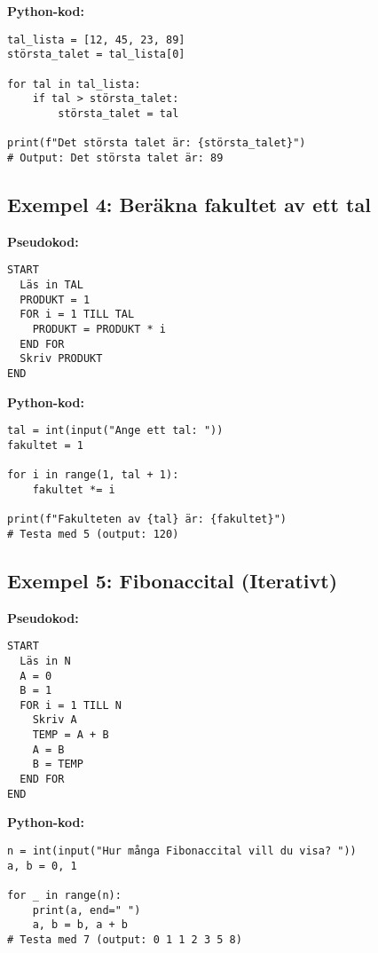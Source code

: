 \textbf{Python-kod:}
\begin{lstlisting}[title=Hitta det största talet i en lista]
tal_lista = [12, 45, 23, 89]
största_talet = tal_lista[0]

for tal in tal_lista:
    if tal > största_talet:
        största_talet = tal

print(f"Det största talet är: {största_talet}")
# Output: Det största talet är: 89
\end{lstlisting}

\subsection*{Exempel 4: Beräkna fakultet av ett tal}

\textbf{Pseudokod:}
\begin{verbatim}
START
  Läs in TAL
  PRODUKT = 1
  FOR i = 1 TILL TAL
    PRODUKT = PRODUKT * i
  END FOR
  Skriv PRODUKT
END
\end{verbatim}

\textbf{Python-kod:}
\begin{lstlisting}[title=Beräkna fakultet av ett tal]
tal = int(input("Ange ett tal: "))
fakultet = 1

for i in range(1, tal + 1):
    fakultet *= i

print(f"Fakulteten av {tal} är: {fakultet}")
# Testa med 5 (output: 120)
\end{lstlisting}

\subsection*{Exempel 5: Fibonaccital (Iterativt)}

\textbf{Pseudokod:}
\begin{verbatim}
START
  Läs in N
  A = 0
  B = 1
  FOR i = 1 TILL N
    Skriv A
    TEMP = A + B
    A = B
    B = TEMP
  END FOR
END
\end{verbatim}

\textbf{Python-kod:}
\begin{lstlisting}[title=Fibonaccital - Iterativ metod]
n = int(input("Hur många Fibonaccital vill du visa? "))
a, b = 0, 1

for _ in range(n):
    print(a, end=" ")
    a, b = b, a + b
# Testa med 7 (output: 0 1 1 2 3 5 8)
\end{lstlisting}
